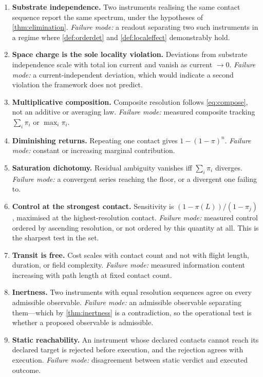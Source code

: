 \documentclass[11pt,a4paper]{article}
\theoremstyle{plain}
\theoremstyle{definition}
\theoremstyle{remark}
\newcommand{\pow}{\pi}
\newcommand{\Lad}{L}
\begin{document}
\begin{enumerate}[label=\textbf{P\arabic*.},leftmargin=3em,itemsep=0.6em]

\item \textbf{Substrate independence.} Two instruments realising the same
contact sequence report the same spectrum, under the hypotheses of
\cref{thm:elimination}. \emph{Failure mode:} a readout separating two such
instruments in a regime where \cref{def:orderdet} and \cref{def:localeffect}
demonstrably hold.

\item \textbf{Space charge is the sole locality violation.} Deviations from
substrate independence scale with total ion current and vanish as current
$\to 0$. \emph{Failure mode:} a current-independent deviation, which would
indicate a second violation the framework does not predict.

\item \textbf{Multiplicative composition.} Composite resolution follows
\cref{eq:compose}, not an additive or averaging law. \emph{Failure mode:}
measured composite tracking $\sum_i \pow_i$ or $\max_i \pow_i$.

\item \textbf{Diminishing returns.} Repeating one contact gives $1-(1-\pow)^n$.
\emph{Failure mode:} constant or increasing marginal contribution.

\item \textbf{Saturation dichotomy.} Residual ambiguity vanishes iff
$\sum_i \pow_i$ diverges. \emph{Failure mode:} a convergent series reaching the
floor, or a divergent one failing to.

\item \textbf{Control at the strongest contact.} Sensitivity is
$(1-\pow(\Lad))/(1-\pow_j)$, maximised at the highest-resolution contact.
\emph{Failure mode:} measured control ordered by ascending resolution, or not
ordered by this quantity at all. This is the sharpest test in the set.

\item \textbf{Transit is free.} Cost scales with contact count and not with
flight length, duration, or field complexity. \emph{Failure mode:} measured
information content increasing with path length at fixed contact count.

\item \textbf{Inertness.} Two instruments with equal resolution sequences agree
on every admissible observable. \emph{Failure mode:} an admissible observable
separating them---which by \cref{thm:inertness} is a contradiction, so the
operational test is whether a proposed observable is admissible.

\item \textbf{Static reachability.} An instrument whose declared contacts cannot
reach its declared target is rejected before execution, and the rejection agrees
with execution. \emph{Failure mode:} disagreement between static verdict and
executed outcome.
\end{enumerate}
\end{document}
